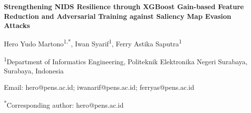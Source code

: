 \documentclass[11pt, a4paper]{article}
\begin{document}
\begin{center}
    {\LARGE \bfseries Strengthening NIDS Resilience through XGBoost Gain-based Feature Reduction and Adversarial Training against Saliency Map Evasion Attacks \par}
    \vspace{0.4cm}
    {\normalsize Hero Yudo Martono\textsuperscript{1,*}, Iwan Syarif\textsuperscript{1}, Ferry Astika Saputra\textsuperscript{1} \par}
    \vspace{0.2cm}
    {\small \textsuperscript{1}Department of Informatics Engineering, Politeknik Elektronika Negeri Surabaya, Surabaya, Indonesia \par}
    \vspace{0.1cm}
    {\small Email: hero@pens.ac.id; iwanarif@pens.ac.id; ferryas@pens.ac.id \par}
    \vspace{0.1cm}
    {\small \textsuperscript{*}Corresponding author: hero@pens.ac.id \par}
\end{center}

\vspace{0.3cm}
\end{document}
